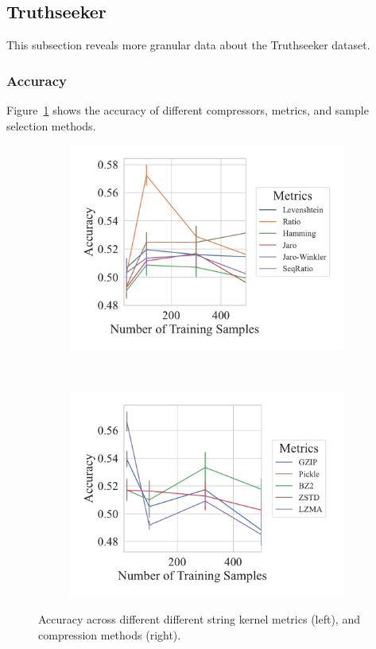 \subsection{Truthseeker}
This subsection reveals more granular data about the Truthseeker dataset.

\subsubsection{Accuracy}
Figure~\ref{fig:truthseeker_accuracy} shows the accuracy of different compressors, metrics, and sample selection methods.

\begin{figure}[h!][h]
	\centering
    \captionsetup[subfigure]{skip=0pt}
	\begin{subfigure}[t]{.44\textwidth}
		\centering
		\includegraphics[width=\textwidth]{figs/truthseeker/string_metric_vs_accuracy.pdf}
	\end{subfigure}
	~
	\begin{subfigure}[t]{.44\textwidth}
		\centering
		\includegraphics[width=\textwidth]{figs/truthseeker/compressor_metric_vs_accuracy.pdf}
	\end{subfigure}
	\caption{Accuracy across different different string kernel metrics (left), and compression methods (right).}
	\label{fig:truthseeker_accuracy}
\end{figure}

